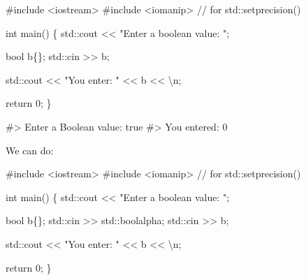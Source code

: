 \documentclass[
  letterpaper,
  DIV=11,
  numbers=noendperiod]{scrreprt}
\newenvironment{Shaded}{\begin{snugshade}}{\end{snugshade}}
\newcommand{\CommentTok}[1]{\textcolor[rgb]{0.37,0.37,0.37}{#1}}
\newcommand{\DecValTok}[1]{\textcolor[rgb]{0.68,0.00,0.00}{#1}}
\newcommand{\ErrorTok}[1]{\textcolor[rgb]{0.68,0.00,0.00}{#1}}
\newcommand{\FunctionTok}[1]{\textcolor[rgb]{0.28,0.35,0.67}{#1}}
\newcommand{\NormalTok}[1]{\textcolor[rgb]{0.00,0.23,0.31}{#1}}
\newcommand{\SpecialCharTok}[1]{\textcolor[rgb]{0.37,0.37,0.37}{#1}}
\newcommand{\StringTok}[1]{\textcolor[rgb]{0.13,0.47,0.30}{#1}}
\begin{document}
\begin{Shaded}
\begin{Highlighting}[]
\CommentTok{\#include \textless{}iostream\textgreater{}}
\CommentTok{\#include \textless{}iomanip\textgreater{}      // for std::setprecision()}

\NormalTok{int }\FunctionTok{main}\NormalTok{()}
\NormalTok{\{}
\NormalTok{    std}\SpecialCharTok{::}\NormalTok{cout }\SpecialCharTok{\textless{}}\ErrorTok{\textless{}} \StringTok{"Enter a boolean value: "}\NormalTok{;}
    
\NormalTok{    bool b\{\};}
\NormalTok{    std}\SpecialCharTok{::}\NormalTok{cin }\SpecialCharTok{\textgreater{}}\ErrorTok{\textgreater{}}\NormalTok{ b;}
    
\NormalTok{    std}\SpecialCharTok{::}\NormalTok{cout }\SpecialCharTok{\textless{}}\ErrorTok{\textless{}} \StringTok{"You enter: "} \SpecialCharTok{\textless{}}\ErrorTok{\textless{}}\NormalTok{ b }\SpecialCharTok{\textless{}}\ErrorTok{\textless{}} \StringTok{\textquotesingle{}}\SpecialCharTok{\textbackslash{}n}\StringTok{\textquotesingle{}}\NormalTok{;}

\NormalTok{    return }\DecValTok{0}\NormalTok{;}
\NormalTok{\}}

\CommentTok{\#\textgreater{} Enter a Boolean value: true}
\CommentTok{\#\textgreater{} You entered: 0}
\end{Highlighting}
\end{Shaded}

We can do:

\begin{Shaded}
\begin{Highlighting}[]
\CommentTok{\#include \textless{}iostream\textgreater{}}
\CommentTok{\#include \textless{}iomanip\textgreater{}      // for std::setprecision()}

\NormalTok{int }\FunctionTok{main}\NormalTok{()}
\NormalTok{\{}
\NormalTok{    std}\SpecialCharTok{::}\NormalTok{cout }\SpecialCharTok{\textless{}}\ErrorTok{\textless{}} \StringTok{"Enter a boolean value: "}\NormalTok{;}
    
\NormalTok{    bool b\{\};}
\NormalTok{    std}\SpecialCharTok{::}\NormalTok{cin }\SpecialCharTok{\textgreater{}}\ErrorTok{\textgreater{}}\NormalTok{ std}\SpecialCharTok{::}\NormalTok{boolalpha;}
\NormalTok{    std}\SpecialCharTok{::}\NormalTok{cin }\SpecialCharTok{\textgreater{}}\ErrorTok{\textgreater{}}\NormalTok{ b;}
    
\NormalTok{    std}\SpecialCharTok{::}\NormalTok{cout }\SpecialCharTok{\textless{}}\ErrorTok{\textless{}} \StringTok{"You enter: "} \SpecialCharTok{\textless{}}\ErrorTok{\textless{}}\NormalTok{ b }\SpecialCharTok{\textless{}}\ErrorTok{\textless{}} \StringTok{\textquotesingle{}}\SpecialCharTok{\textbackslash{}n}\StringTok{\textquotesingle{}}\NormalTok{;}

\NormalTok{    return }\DecValTok{0}\NormalTok{;}
\NormalTok{\}}
\end{Highlighting}
\end{Shaded}
\end{document}
